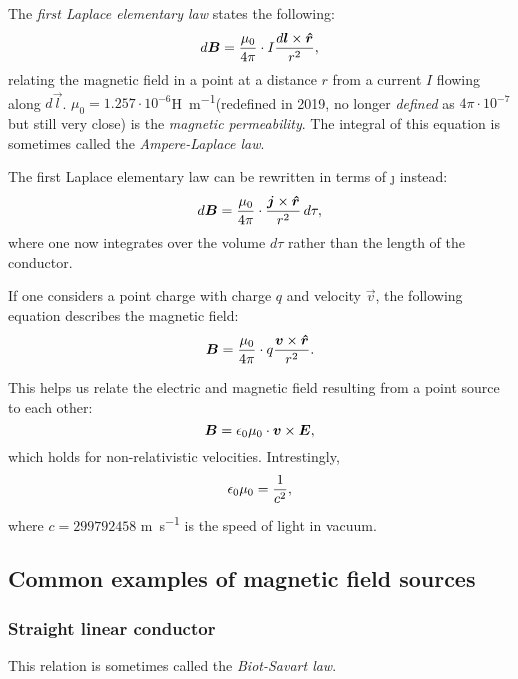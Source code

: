     The \textit{first Laplace elementary law} states the following:
    \begin{equation}
        d\B = \frac{\mu_0}{4\pi}\cdot I\frac{d\vec{l}\times\hat{r}}{r^2},
    \end{equation}
    relating the magnetic field in a point at a distance $r$ from a current $I$ flowing along $d\vec{l}$.
    $\mu_0 = 1.257\cdot 10^{-6}$\si{\henry\per\metre}(redefined in 2019, 
    no longer \textit{defined} as $4\pi\cdot10^{-7}$ but still very close) is the \textit{magnetic permeability}. 
    The integral of this equation is sometimes called the \textit{Ampere-Laplace law}.

    The first Laplace elementary law can be rewritten in terms of \j{} instead:
    \begin{equation}
        d\B = \frac{\mu_0}{4\pi}\cdot \frac{\j\times\hat{r}}{r^2}\,d\tau,
    \end{equation}
    where one now integrates over the volume $d\tau$ rather than the length of the conductor.

    If one considers a point charge with charge $q$ and velocity $\vec{v}$, 
    the following equation describes the magnetic field:
    \begin{equation}
        \B = \frac{\mu_0}{4\pi}\cdot q\frac{\vec{v}\times\hat{r}}{r^2}.
    \end{equation}

    This helps us relate the electric and magnetic field resulting from a point source to each other:
    \begin{equation}
        \bm{B} = \epsilon_0 \mu_0 \cdot\bm{v}\times\bm{E},
    \end{equation}
    which holds for non-relativistic velocities. Intrestingly,
    \begin{equation}
        \epsilon_0\mu_0 = \frac{1}{c^2},
    \end{equation}
    where $c = 299792458$ \si{\metre\per\second} is the speed of light in vacuum. 

\subsection{Common examples of magnetic field sources}
    \subsubsection{Straight linear conductor}
        This relation is sometimes called the \textit{Biot-Savart law}.

